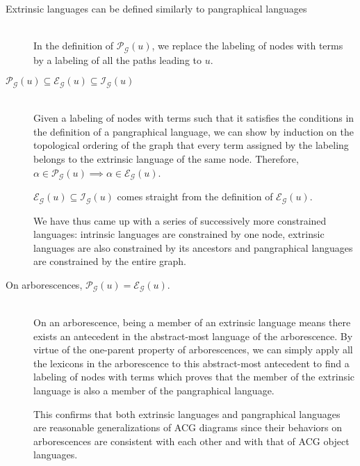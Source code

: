 \begin{description}
  \item[Extrinsic languages can be defined similarly to pangraphical
    languages] \hfill \\

    In the definition of $\mathcal{P}_{\mathcal{G}}(u)$, we replace the
    labeling of nodes with terms by a labeling of all the paths leading
    to $u$.

  \item[$\mathcal{P}_{\mathcal{G}}(u) \subseteq
    \mathcal{E}_{\mathcal{G}}(u) \subseteq
    \mathcal{I}_{\mathcal{G}}(u)$] \hfill \\

    Given a labeling of nodes with terms such that it satisfies the
    conditions in the definition of a pangraphical language, we can show
    by induction on the topological ordering of the graph that every
    term assigned by the labeling belongs to the extrinsic language of
    the same node. Therefore, $\alpha \in \mathcal{P}_{\mathcal{G}}(u)
    \implies \alpha \in \mathcal{E}_{\mathcal{G}}(u)$.

    $\mathcal{E}_{\mathcal{G}}(u) \subseteq
    \mathcal{I}_{\mathcal{G}}(u)$ comes straight from the definition of
    $\mathcal{E}_{\mathcal{G}}(u)$.

    We have thus came up with a series of successively more constrained
    languages: intrinsic languages are constrained by one node,
    extrinsic languages are also constrained by its ancestors and
    pangraphical languages are constrained by the entire graph.

  \item[On arborescences, $\mathcal{P}_{\mathcal{G}}(u) =
    \mathcal{E}_{\mathcal{G}}(u)$.] \hfill \\

    On an arborescence, being a member of an extrinsic language means
    there exists an antecedent in the abstract-most language of the
    arborescence. By virtue of the one-parent property of arborescences,
    we can simply apply all the lexicons in the arborescence to this
    abstract-most antecedent to find a labeling of nodes with terms
    which proves that the member of the extrinsic language is also a
    member of the pangraphical language.

    This confirms that both extrinsic languages and pangraphical
    languages are reasonable generalizations of ACG diagrams since their
    behaviors on arborescences are consistent with each other and with
    that of ACG object languages.


\end{description}
